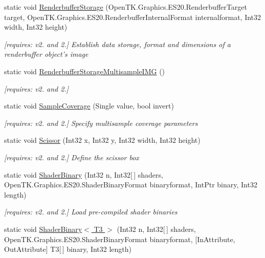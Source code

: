 \begin{DoxyCompactItemize}
static void \hyperlink{class_open_t_k_1_1_graphics_1_1_e_s20_1_1_g_l_aec8d3eeef9d94aa5ddf5782b13b8dd15}{Renderbuffer\-Storage} (Open\-T\-K.\-Graphics.\-E\-S20.\-Renderbuffer\-Target target, Open\-T\-K.\-Graphics.\-E\-S20.\-Renderbuffer\-Internal\-Format internalformat, Int32 width, Int32 height)
\begin{DoxyCompactList}\small\item\em \mbox{[}requires\-: v2. and 2.\mbox{]} Establish data storage, format and dimensions of a renderbuffer object's image \end{DoxyCompactList}\item 
static void \hyperlink{class_open_t_k_1_1_graphics_1_1_e_s20_1_1_g_l_ae5be4c5ee018a70e357c0f71bcbe649f}{Renderbuffer\-Storage\-Multisample\-I\-M\-G} ()
\begin{DoxyCompactList}\small\item\em \mbox{[}requires\-: v2. and 2.\mbox{]}\end{DoxyCompactList}\item 
static void \hyperlink{class_open_t_k_1_1_graphics_1_1_e_s20_1_1_g_l_a9e3db0df44de832a3909d566c9e747cb}{Sample\-Coverage} (Single value, bool invert)
\begin{DoxyCompactList}\small\item\em \mbox{[}requires\-: v2. and 2.\mbox{]} Specify multisample coverage parameters \end{DoxyCompactList}\item 
static void \hyperlink{class_open_t_k_1_1_graphics_1_1_e_s20_1_1_g_l_ae716e63a151642b4300615ca9ebad718}{Scissor} (Int32 x, Int32 y, Int32 width, Int32 height)
\begin{DoxyCompactList}\small\item\em \mbox{[}requires\-: v2. and 2.\mbox{]} Define the scissor box \end{DoxyCompactList}\item 
static void \hyperlink{class_open_t_k_1_1_graphics_1_1_e_s20_1_1_g_l_af82c21006ea303c9b83a7f0144d8d975}{Shader\-Binary} (Int32 n, Int32\mbox{[}$\,$\mbox{]} shaders, Open\-T\-K.\-Graphics.\-E\-S20.\-Shader\-Binary\-Format binaryformat, Int\-Ptr binary, Int32 length)
\begin{DoxyCompactList}\small\item\em \mbox{[}requires\-: v2. and 2.\mbox{]} Load pre-\/compiled shader binaries \end{DoxyCompactList}\item 
static void \hyperlink{class_open_t_k_1_1_graphics_1_1_e_s20_1_1_g_l_a79384b73a6720011f99c2640e5bc9313}{Shader\-Binary$<$ T3 $>$} (Int32 n, Int32\mbox{[}$\,$\mbox{]} shaders, Open\-T\-K.\-Graphics.\-E\-S20.\-Shader\-Binary\-Format binaryformat, \mbox{[}In\-Attribute, Out\-Attribute\mbox{]} T3\mbox{[}$\,$\mbox{]} binary, Int32 length)

\end{DoxyCompactItemize}
